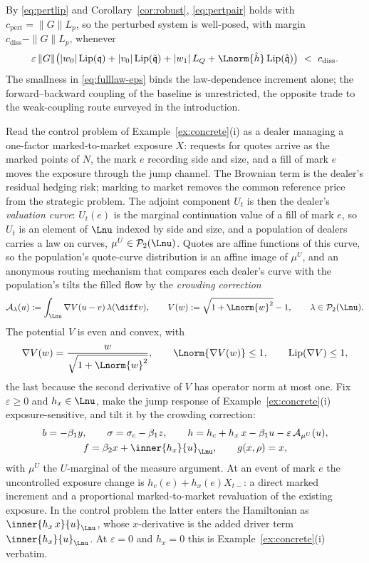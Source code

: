 \begin{example}
By \eqref{eq:pertlip} and Corollary~\ref{cor:robust}, \eqref{eq:pertpair} holds with
$c_{\mathrm{pert}}=\|G\|L_p$, so the perturbed system is well-posed, with margin
$c_{\mathrm{diss}}-\|G\|L_p$, whenever
\begin{equation}\label{eq:fulllaw-eps}
\varepsilon\,\|G\|\bigl(|w_0|\,\mathrm{Lip}(\mathfrak q)+|v_0|\,\mathrm{Lip}(\tilde{\mathfrak q})+|w_1|\,L_Q
+\Lnorm{\hat h}\,\mathrm{Lip}(\hat{\mathfrak q})\bigr)\ <\ c_{\mathrm{diss}} .
\end{equation}
The smallness in \eqref{eq:fulllaw-eps} binds the law-dependence increment alone; the
forward--backward coupling of the baseline is unrestricted, the opposite trade to the
weak-coupling route surveyed in the introduction.
\end{example}

\begin{example}\label{ex:dealer}
Read the control problem of Example~\ref{ex:concrete}(i) as a dealer managing a one-factor
marked-to-market exposure $X$: requests for quotes arrive as the marked points of $N$, the
mark $e$ recording side and size, and a fill of mark $e$ moves the exposure through the
jump channel. The Brownian term is the dealer's residual hedging risk; marking to market
removes the common reference price from the strategic problem. The adjoint component $U_t$ is then the dealer's \emph{valuation curve}:
$U_t(e)$ is the marginal continuation value of a fill of mark $e$, so $U_t$ is an element
of $\Lnu$ indexed by side and size, and a population of dealers carries a law on curves,
$\mu^U\in\mathcal P_2(\Lnu)$. Quotes are affine functions of this curve, so the
population's quote-curve distribution is an affine image of $\mu^U$, and an anonymous
routing mechanism that compares each dealer's curve with the population's tilts the filled
flow by the \emph{crowding correction}
\[
\mathcal A_\lambda(u):=\int_{\Lnu}\nabla V(u-v)\,\lambda(\diff v),\qquad
V(w):=\sqrt{1+\Lnorm{w}^2}-1,\qquad \lambda\in\mathcal P_2(\Lnu).
\]
The potential $V$ is even and convex, with
\[
\nabla V(w)=\frac{w}{\sqrt{1+\Lnorm{w}^2}},\qquad \Lnorm{\nabla V(w)}\le1,\qquad
\mathrm{Lip}(\nabla V)\le1,
\]
the last because the second derivative of $V$ has operator norm at most one.
Fix $\varepsilon\ge0$ and $h_x\in\Lnu$, make the jump response of
Example~\ref{ex:concrete}(i) exposure-sensitive, and tilt it by the crowding correction:
\[
\begin{gathered}
b=-\beta_1 y,\qquad \sigma=\sigma_c-\beta_1 z,\qquad
h=h_c+h_x\,x-\beta_1 u-\varepsilon\,\mathcal A_{\mu^U}(u),\\
f=\beta_2 x+\inner{h_x}{u}_{\Lnu},\qquad g(x,\rho)=x ,
\end{gathered}
\]
with $\mu^U$ the $U$-marginal of the measure argument. At an event of mark $e$ the
uncontrolled exposure change is $h_c(e)+h_x(e)X_{t-}$: a direct marked increment and a
proportional marked-to-market revaluation of the existing exposure. In the control problem
the latter enters the Hamiltonian as $\inner{h_x\,x}{u}_{\Lnu}$, whose $x$-derivative is
the added driver term $\inner{h_x}{u}_{\Lnu}$. At $\varepsilon=0$ and $h_x=0$ this is
Example~\ref{ex:concrete}(i) verbatim.


\end{example}
